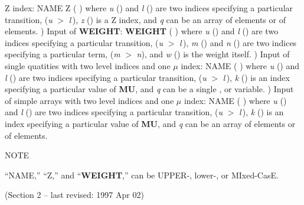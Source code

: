 Z index:
\space
NAME   \quad Z  
\quad (  \quad )
\space
where {\it u} (\intg) and {\it l} (\intg) are two indices specifying a particular
transition, ({\it u} $>$ {\it l}$\,$), {\it z} (\intg) is a Z index,
and {\it q} can be an array of {\intg}
elements or of {\flpt} elements.
\ej
{}) Input of {\bf WEIGHT}:
\space
{\bf WEIGHT}   \quad (
   \quad )
\space
where {\it u} (\intg) and {\it l} (\intg) are two indices specifying a particular
transition, ({\it u} $>$ {\it l}$\,$), {\it m} (\intg) and {\it n} (\intg) are two
indices specifying a particular term, ({\it m} $>$ {\it n}), and {\it w}
(\flpt) is the weight itself.
\blankline
\blankline
{}) Input of single quatities with two level indices and one
$\mu$ index:
\space
NAME    \quad (  \quad )
\space
where {\it u} (\intg) and {\it l} (\intg) are two indices specifying a particular
transition, ({\it u} $>$ {\it l}$\,$), {\it k} (\intg) is an index specifying a
particular value of {\bf MU}, and {\it q} can be a single \intg, {\flpt} or
{\alfa} variable.
\blankline
\blankline
{}) Input of simple arrays with two level indices and one
$\mu$ index:
\space
NAME    \quad (  \quad )
\space
where {\it u} (\intg) and {\it l} (\intg) are two indices specifying a particular
transition, ({\it u} $>$ {\it l}$\,$), {\it k} (\intg) is an index specifying a
particular value of {\bf MU}, and {\it q} can be an array of {\intg} elements or 
of {\flpt} elements.
\blankline
\blankline
\centerline{NOTE}
\blankline
\centerline{``NAME,'' ``Z,'' and ``{\bf WEIGHT},'' can be UPPER-, lower-, or
MIxed-CasE.}
\vfill
\noindent (Section 2 -- last revised: 1997 Apr 02) \par
{}
\ej
